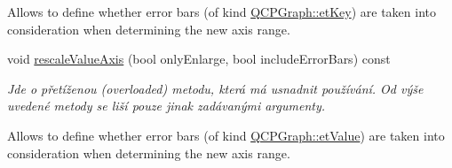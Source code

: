 \begin{DoxyCompactItemize}
\begin{DoxyCompactList}
Allows to define whether error bars (of kind \hyperlink{classQCPGraph_ad23b514404bd2cb3216f57c90904d6afa2a5d89cd76fb8b6b18d71b8f6f6c0f43}{Q\+C\+P\+Graph\+::et\+Key}) are taken into consideration when determining the new axis range. \end{DoxyCompactList}\item 
void \hyperlink{classQCPGraph_a2ba0e1df416486d7e74299ef8cf68bba}{rescale\+Value\+Axis} (bool only\+Enlarge, bool include\+Error\+Bars) const 
\begin{DoxyCompactList}\small\item\em Jde o přetíženou (overloaded) metodu, která má usnadnit používání. Od výše uvedené metody se liší pouze jinak zadávanými argumenty.

Allows to define whether error bars (of kind \hyperlink{classQCPGraph_ad23b514404bd2cb3216f57c90904d6afa147022ccdc49f6bd48f904cb4f61872e}{Q\+C\+P\+Graph\+::et\+Value}) are taken into consideration when determining the new axis range. \end{DoxyCompactList}\end{DoxyCompactItemize}
